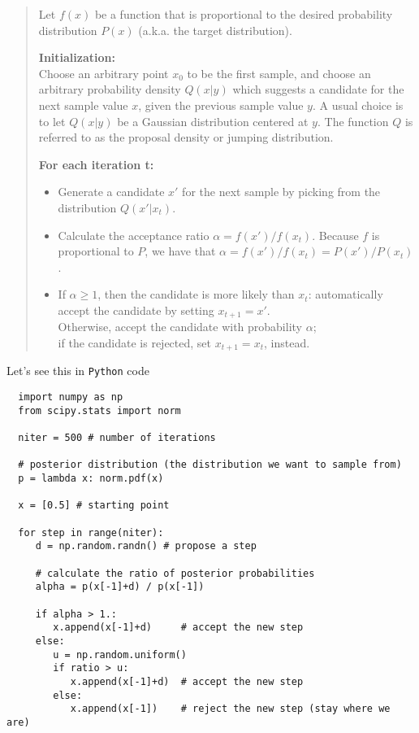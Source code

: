 \documentclass[a4paper,11pt]{article}
\begin{document}
\begin{quote}
   Let $f(x)$ be a function that is proportional to the desired probability distribution $P(x)$ (a.k.a. the target distribution).

    \textbf{Initialization:}\\
    Choose an arbitrary point $x_0$ to be the first sample, and choose an arbitrary probability density $Q(x|y)$ which suggests a candidate for the next sample value $x$, given the previous sample value $y$. A usual choice is to let $Q(x|y)$ be a Gaussian distribution centered at $y$. The function $Q$ is referred to as the proposal density or jumping distribution.

    \textbf{For each iteration t:}
    \begin{itemize}
      \item Generate a candidate $x'$ for the next sample by picking from the distribution $Q(x'|x_t)$.
      \item Calculate the acceptance ratio $\alpha = f(x')/f(x_t)$. Because $f$ is proportional to $P$, we have that $\alpha = f(x')/f(x_t) = P(x')/P(x_t)$.
      \item If $\alpha \geq 1$, then the candidate is more likely than $x_t$: automatically accept the candidate by setting $x_{t+1} = x'$. \\
      Otherwise, accept the candidate with probability $\alpha$;\\
      if the candidate is rejected, set $x_{t+1} = x_t$, instead.
\end{itemize}
\end{quote}

\noindent Let's see this in \texttt{Python} code


\begin{verbatim}
  import numpy as np
  from scipy.stats import norm
  
  niter = 500 # number of iterations
  
  # posterior distribution (the distribution we want to sample from)
  p = lambda x: norm.pdf(x)
  
  x = [0.5] # starting point
  
  for step in range(niter):
     d = np.random.randn() # propose a step

     # calculate the ratio of posterior probabilities
     alpha = p(x[-1]+d) / p(x[-1])
  
     if alpha > 1.:
        x.append(x[-1]+d)     # accept the new step
     else:
        u = np.random.uniform()
        if ratio > u:
           x.append(x[-1]+d)  # accept the new step
        else:
           x.append(x[-1])    # reject the new step (stay where we are)
\end{verbatim}
\end{document}
